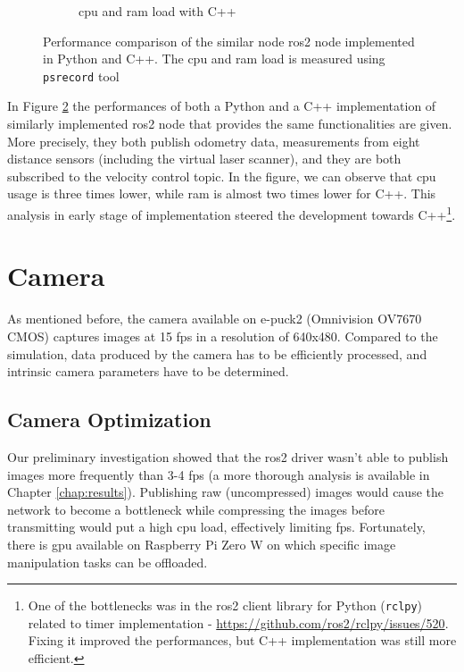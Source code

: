 \begin{figure}[H]
\begin{subfigure}{.8\textwidth}
  \caption{\ac{cpu} and \ac{ram} load with C++}
  \label{fig:physical:py_vs_cpp:cpp}
\end{subfigure}
\caption[Performance comparison of implementations in Python and C++]{Performance comparison of the similar node \ac{ros2} node implemented in Python and C++. The \ac{cpu} and \ac{ram} load is measured using \texttt{psrecord} tool\footnotemark}
\label{fig:physical:py_vs_cpp}
\end{figure}

In Figure \ref{fig:physical:py_vs_cpp} the performances of both a Python and a C++ implementation of similarly implemented \ac{ros2} node that provides the same functionalities are given.
More precisely, they both publish odometry data, measurements from eight distance sensors (including the virtual laser scanner), and they are both subscribed to the velocity control topic.
In the figure, we can observe that \ac{cpu} usage is three times lower, while \ac{ram} is almost two times lower for C++.
This analysis in early stage of implementation steered the development towards C++\footnote{One of the bottlenecks was in the \ac{ros2} client library for Python (\texttt{rclpy}) related to timer implementation - \url{https://github.com/ros2/rclpy/issues/520}. Fixing it improved the performances, but C++ implementation was still more efficient.}.

\section{Camera}
As mentioned before, the camera available on e-puck2 (Omnivision OV7670 CMOS) captures images at 15 \acs{fps} in a resolution of 640x480.
Compared to the simulation, data produced by the camera has to be efficiently processed, and intrinsic camera parameters have to be determined.

\subsection{Camera Optimization}
Our preliminary investigation showed that the \ac{ros2} driver wasn't able to publish images more frequently than 3-4 \acs{fps} (a more thorough analysis is available in Chapter \ref{chap:results}).
Publishing raw (uncompressed) images would cause the network to become a bottleneck while compressing the images before transmitting would put a high \ac{cpu} load, effectively limiting \ac{fps}.
Fortunately, there is \ac{gpu} available on Raspberry Pi Zero W on which specific image manipulation tasks can be offloaded.


